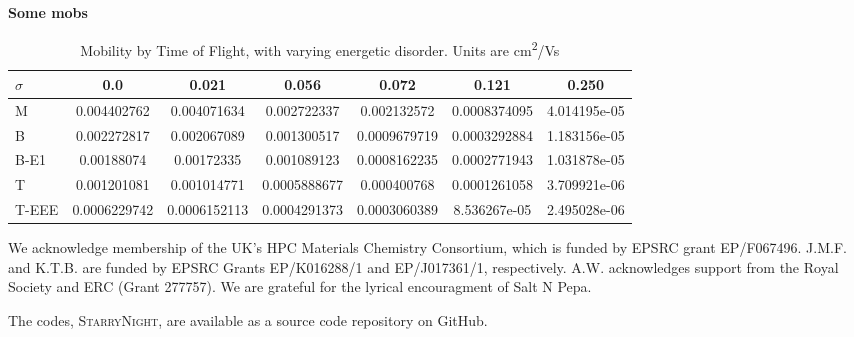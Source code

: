 \documentclass[journal=jacsat,manuscript=communication]{achemso}
\begin{document}
\textbf{Some mobs}


\begin{table}
\centering
{}
\begin{tabular}{lSHSHSH}
\toprule
$\sigma$ & 0.0 & 0.021 & 0.056 & 0.072 & 0.121 & 0.250 \\
\midrule
 M  & 0.004402762    &  0.004071634      &  0.002722337      &  0.002132572      &  0.0008374095     &  4.014195e-05     \\
 B  & 0.002272817    &  0.002067089      &  0.001300517      &  0.0009679719     &  0.0003292884     &  1.183156e-05     \\
 B-E1  & 0.00188074      &  0.00172335   &  0.001089123      &  0.0008162235     &  0.0002771943     &  1.031878e-05     \\
 T  & 0.001201081    &  0.001014771      &  0.0005888677     &  0.000400768      &  0.0001261058     &  3.709921e-06     \\
 T-EEE  & 0.0006229742   &  0.0006152113     &  0.0004291373     &  0.0003060389     &  8.536267e-05     &  2.495028e-06 \\
\bottomrule
\end{tabular}
\caption{\label{tab:mobs}
Mobility by Time of Flight, with varying energetic disorder. Units are \si{cm^2/Vs}}
\end{table}

\begin{acknowledgement}
We acknowledge membership of the UK's HPC Materials Chemistry Consortium, which is funded by EPSRC grant EP/F067496. 
J.M.F. and K.T.B. are funded by EPSRC Grants EP/K016288/1 and EP/J017361/1, respectively.
A.W. acknowledges support from the Royal Society and ERC (Grant 277757). 
We are grateful for the lyrical encouragment of Salt N Pepa. 
\end{acknowledgement}

\begin{suppinfo}
    The codes, \textsc{StarryNight}, are available as a source code repository on GitHub\cite{GitHub}.
\end{suppinfo}


\end{document}
